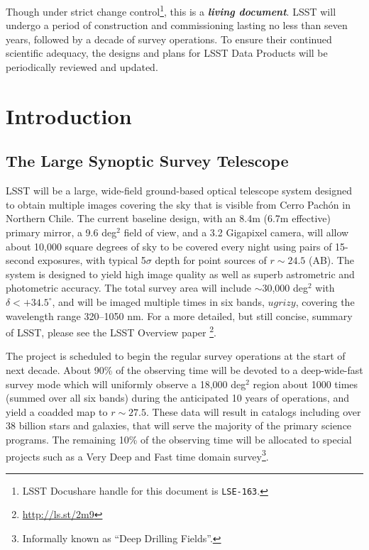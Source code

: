 \documentclass[12pt]{article}
\begin{document}
Though under strict change control\footnote{LSST Docushare handle for this document is \texttt{LSE-163}.}, this is a \textbf{\emph{living document}}. LSST will undergo a period of construction  and commissioning lasting no less than seven years, followed by a decade of survey operations. To ensure their continued scientific adequacy, the designs and plans for LSST Data Products will be periodically reviewed and updated.

\clearpage

\section{Introduction}

\subsection{The Large Synoptic Survey Telescope}

LSST will be a large, wide-field ground-based optical telescope system
designed to obtain multiple images covering the sky that is visible from Cerro Pach\'{o}n in Northern Chile. The current baseline design, with an 8.4m (6.7m effective) primary mirror, a 9.6 deg$^2$ field of view, and a 3.2 Gigapixel camera, will allow about 10,000 square degrees of sky to be covered every night using pairs of 15-second exposures, with typical 5$\sigma$ depth for point sources of $r\sim24.5$ (AB). The system is designed to yield high image quality as well as superb astrometric  and photometric accuracy. The total survey area will include $\sim$30,000 deg$^2$ with $\delta<+34.5^\circ$, and will be imaged multiple times in six bands, $ugrizy$, covering the wavelength range 320--1050 nm. For a more detailed, but still concise,
summary of LSST, please see the LSST Overview paper \citep{2008arXiv0805.2366I}\footnote{\url{http://ls.st/2m9}}.

The project is scheduled to  begin the regular survey operations at the start of next decade. About 90\% of the observing time will be devoted to a deep-wide-fast survey mode which will uniformly observe a 18,000 deg$^2$ region about 1000 times (summed over all six bands) during the anticipated 10 years of operations, and yield a coadded map to $r\sim27.5$. These data will result in catalogs including over $38$ billion stars and galaxies, that will serve the majority of the primary science programs. The remaining 10\% of the observing time will be allocated to special projects such as a Very Deep and Fast time domain survey\footnote{Informally known as ``Deep Drilling Fields''.}.
\end{document}
